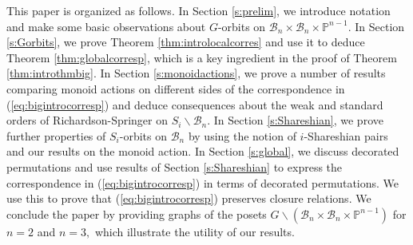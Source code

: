 \documentclass[12pt]{amsart}
\numberwithin{equation}{section}
\newcommand{\B}{\mathcal{B}}
\begin{document}
 This paper is organized as follows.  In Section \ref{s:prelim}, we introduce notation and make some basic observations about $G$-orbits on $\B_{n} \times \B_{n} \times \mathbb{P}^{n-1}.$  In Section \ref{s:Gorbits}, we prove Theorem \ref{thm:introlocalcorres} and use it to deduce   Theorem  \ref{thm:globalcorresp}, which is a key ingredient in the proof of Theorem \ref{thm:introthmbig}.  In Section \ref{s:monoidactions}, we prove a number of results comparing monoid actions on different sides of the correspondence in (\ref{eq:bigintrocorresp})
and deduce consequences about the weak and standard orders of Richardson-Springer on $S_{i}\backslash\B_{n}$.  In Section \ref{s:Shareshian}, we prove further properties of $S_i$-orbits on $\B_{n}$ by using the notion of $i$-Shareshian pairs and our results on the monoid action. In Section \ref{s:global}, we discuss decorated permutations and use results of Section \ref{s:Shareshian} to express the correspondence in (\ref{eq:bigintrocorresp}) in terms of decorated permutations.  We use this to prove that (\ref{eq:bigintrocorresp}) preserves closure relations.
  We conclude the paper by providing graphs of the posets $G\backslash(\B_{n}\times \B_{n}\times\mathbb{P}^{n-1})$ for $n=2$ and $n=3,$ which illustrate the utility of our results.


\end{document}
